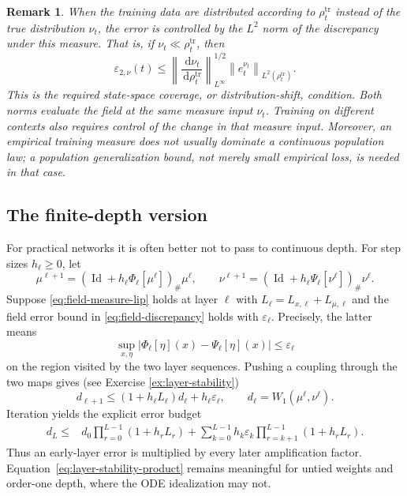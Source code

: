 \documentclass[11pt]{amsart}
\numberwithin{equation}{section}
\theoremstyle{plain}
\newtheorem{remark}[theorem]{Remark}
\newcommand{\dd}{\,\mathrm{d}}
\newcommand{\abs}[1]{\left\lvert#1\right\rvert}
\newcommand{\norm}[1]{\left\lVert#1\right\rVert}
\DeclareMathOperator{\Id}{Id}
\begin{document}
\begin{remark}
When the training data are distributed according to $\rho_t^{\mathrm{tr}}$ instead of the true distribution $\nu_t$, the error is controlled by the $L^2$ norm of the discrepancy under this measure. That is, if
$\nu_t\ll\rho_t^{\mathrm{tr}}$, then
\[
 \varepsilon_{2,\nu}(t)
 \leq  \left\|\frac{\dd\nu_t}{\dd\rho_t^{\mathrm{tr}}}\right\|_{L^\infty} ^{1/2}
 \norm{e_t^{\nu_t}}_{L^2(\rho_t^{\mathrm{tr}})}.
\]
This is the required state-space coverage, or distribution-shift, condition.
Both norms evaluate the field at the same measure input $\nu_t$.
Training on different contexts also requires control of the change in that
measure input.  Moreover, an empirical training measure does not usually
dominate a continuous population law; a population generalization bound,
not merely small empirical loss, is needed in that case.
\end{remark}

\subsection{The finite-depth version}
For practical networks it is often better not to pass to continuous depth.
For step sizes $h_\ell\geq0$, let
\[
 \mu^{\ell+1}
  =(\Id+h_\ell\Phi_\ell[\mu^\ell])_\#\mu^\ell,\qquad
 \nu^{\ell+1}
  =(\Id+h_\ell\Psi_\ell[\nu^\ell])_\#\nu^\ell.
\]
Suppose \eqref{eq:field-measure-lip} holds at layer $\ell$ with
$L_\ell=L_{x,\ell}+L_{\mu,\ell}$ and the field error bound in \eqref{eq:field-discrepancy} holds with
$\varepsilon_\ell$.
Precisely, the latter means
\[
 \sup_{x,\eta}
 \abs{\Phi_\ell[\eta](x)-\Psi_\ell[\eta](x)}
 \leq\varepsilon_\ell
\]
on the region visited by the two layer sequences. Pushing a coupling through the two maps gives (see Exercise \ref{ex:layer-stability})
\begin{equation}\label{eq:layer-stability-recursion}
 d_{\ell+1}\leq(1+h_\ell L_\ell)d_\ell+h_\ell\varepsilon_\ell,
 \qquad d_\ell=W_1(\mu^\ell,\nu^\ell).
\end{equation}
Iteration yields the explicit error budget
\begin{equation}\label{eq:layer-stability-product}
\begin{split}
 d_L\leq{}&
 d_0\prod_{r=0}^{L-1}(1+h_rL_r) +\sum_{k=0}^{L-1}h_k\varepsilon_k
   \prod_{r=k+1}^{L-1}(1+h_rL_r).
\end{split}
\end{equation}
Thus an early-layer error is multiplied by every later amplification factor.
Equation~\eqref{eq:layer-stability-product} remains meaningful for untied
weights and order-one depth, where the ODE idealization may not.
\end{document}
